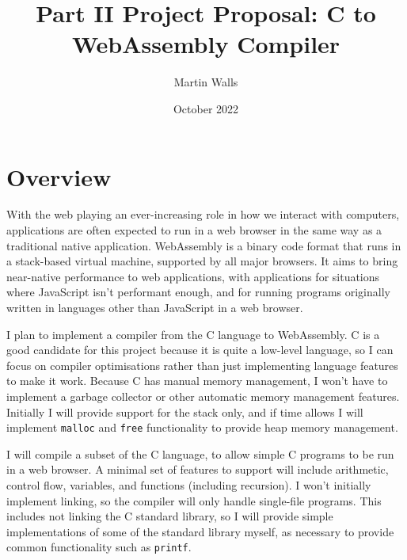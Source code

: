 \documentclass[12pt,a4paper]{article}
\title{Part II Project Proposal: C to WebAssembly Compiler}
\author{Martin Walls}
\date{October 2022}
\begin{document}


\setcounter{page}{1}

\maketitle
\thispagestyle{firstpage}

\section*{Overview}

With the web playing an ever-increasing role in how we interact with computers, applications are often expected to run in a web browser in the same way as a traditional native application. Web\-Assembly is a binary code format that runs in a stack-based virtual machine, supported by all major browsers. It aims to bring near-native performance to web applications, with applications for situations where JavaScript isn't performant enough, and for running programs originally written in languages other than JavaScript in a web browser.

I plan to implement a compiler from the C language to WebAssembly.
C is a good candidate for this project because it is quite a low-level language, so I can focus on compiler optimisations rather than just implementing language features to make it work. Because C has manual memory management, I won't have to implement a garbage collector or other automatic memory management features.
Initially I will provide support for the stack only, and if time allows I will implement \texttt{malloc} and \texttt{free} functionality to provide heap memory management.

I will compile a subset of the C language, to allow simple C programs to be run in a web browser. A minimal set of features to support will include arithmetic, control flow, variables, and functions (including recursion).
I won't initially implement linking, so the compiler will only handle single-file programs. This includes not linking the C standard library, so I will provide simple implementations of some of the standard library myself, as necessary to provide common functionality such as \texttt{printf}.
\end{document}
